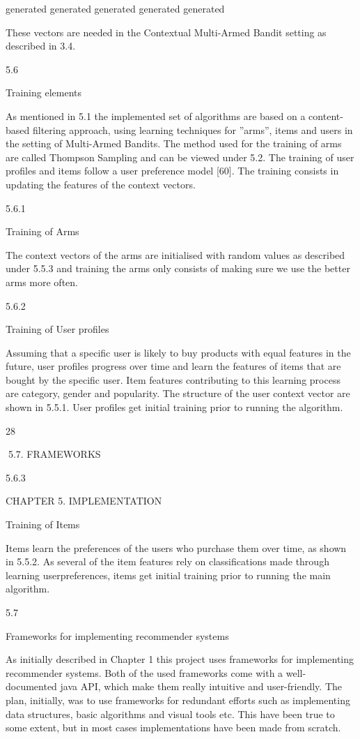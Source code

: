 generated
generated
generated
generated
generated

These vectors are needed in the Contextual Multi-Armed Bandit setting as described in
3.4.

5.6

Training elements

As mentioned in 5.1 the implemented set of algorithms are based on a content-based
filtering approach, using learning techniques for ”arms”, items and users in the setting of
Multi-Armed Bandits. The method used for the training of arms are called Thompson
Sampling and can be viewed under 5.2. The training of user profiles and items follow a
user preference model [60]. The training consists in updating the features of the context
vectors.

5.6.1

Training of Arms

The context vectors of the arms are initialised with random values as described under
5.5.3 and training the arms only consists of making sure we use the better arms more
often.

5.6.2

Training of User profiles

Assuming that a specific user is likely to buy products with equal features in the future,
user profiles progress over time and learn the features of items that are bought by the
specific user. Item features contributing to this learning process are category, gender and
popularity. The structure of the user context vector are shown in 5.5.1. User profiles get
initial training prior to running the algorithm.

28

5.7. FRAMEWORKS

5.6.3

CHAPTER 5. IMPLEMENTATION

Training of Items

Items learn the preferences of the users who purchase them over time, as shown in
5.5.2. As several of the item features rely on classifications made through learning userpreferences, items get initial training prior to running the main algorithm.

5.7

Frameworks for implementing recommender systems

As initially described in Chapter 1 this project uses frameworks for implementing recommender systems. Both of the used frameworks come with a well-documented java API,
which make them really intuitive and user-friendly. The plan, initially, was to use frameworks for redundant efforts such as implementing data structures, basic algorithms and
visual tools etc. This have been true to some extent, but in most cases implementations
have been made from scratch.


